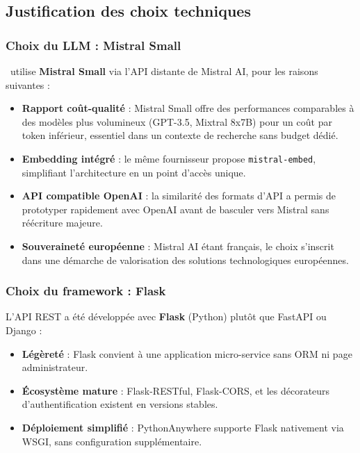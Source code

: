 \subsection{Justification des choix techniques}

\subsubsection{Choix du LLM : Mistral Small}

\AZIZA\ utilise \textbf{Mistral Small} via l'API distante de Mistral AI, pour les raisons suivantes :

\begin{itemize}
    \item \textbf{Rapport coût-qualité} : Mistral Small offre des performances comparables à des modèles plus volumineux (GPT-3.5, Mixtral 8x7B) pour un coût par token inférieur, essentiel dans un contexte de recherche sans budget dédié.
    \item \textbf{Embedding intégré} : le même fournisseur propose \texttt{mistral-embed}, simplifiant l'architecture en un point d'accès unique.
    \item \textbf{API compatible OpenAI} : la similarité des formats d'API a permis de prototyper rapidement avec OpenAI avant de basculer vers Mistral sans réécriture majeure.
    \item \textbf{Souveraineté européenne} : Mistral AI étant français, le choix s'inscrit dans une démarche de valorisation des solutions technologiques européennes.
\end{itemize}

\subsubsection{Choix du framework : Flask}

L'API REST a été développée avec \textbf{Flask} (Python) plutôt que FastAPI ou Django :

\begin{itemize}
    \item \textbf{Légèreté} : Flask convient à une application micro-service sans ORM ni page administrateur.
    \item \textbf{Écosystème mature} : Flask-RESTful, Flask-CORS, et les décorateurs d'authentification existent en versions stables.
    \item \textbf{Déploiement simplifié} : PythonAnywhere supporte Flask nativement via WSGI, sans configuration supplémentaire.
\end{itemize}


